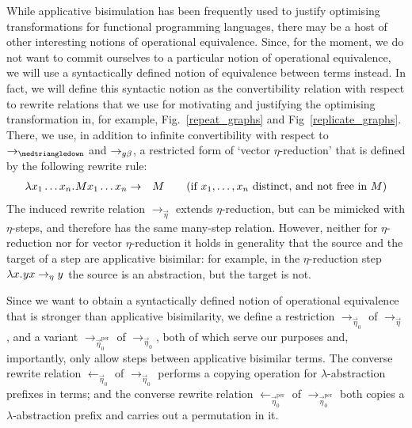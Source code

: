 \documentclass[submission,copyright,creativecommons]{eptcs}
\newcommand{\slabs}{{\lambda}}
\newcommand{\lbind}[1]{{\slabs{#1}}}
\newcommand{\labs}[2]{\lbind{#1}.\hspace*{0.5pt}{#2}}
\newcommand{\lapp}[2]{{#1}{#2}}
\newcommand{\avar}{x}
\newcommand{\bvar}{y}
\newcommand{\alter}{M}
\newcommand{\sred}{\rightarrow}
\newcommand{\red}{\mathrel{\sred}}
\newcommand{\indap}[2]{#1_{#2}}
\newcommand{\sredi}{\indap{\rightarrow}}
\newcommand{\sinvredi}{\indap{\leftarrow}}
\newcommand{\genbetaredsubscript}{g\hspace*{0pt}\beta}
\newcommand{\sgenbetared}{\sredi{\genbetaredsubscript}}
\newcommand{\setared}{\sredi{\eta}}
\newcommand{\etared}{\mathrel{\setared}}
\newcommand{\veceta}{\vec{\eta}}
\newcommand{\svecetared}{\sredi{\veceta}}
\newcommand{\vecetazero}{\vec{\eta}_0}
\newcommand{\svecetazerored}{\sredi{\vecetazero}}
\newcommand{\sinvvecetazerored}{\sinvredi{\vecetazero}}
\newcommand{\vecetazeroperm}{\vec{\eta}_{0}^{\text{per}}}
\newcommand{\svecetazeropermred}{\sredi{{\vecetazeroperm}}}
\newcommand{\sinvvecetazeropermred}{\sinvredi{\vecetazeroperm}}
\newcommand{\unfoldredsubscript}{\medtriangledown}
\newcommand{\sunfoldred}{\sredi{\unfoldredsubscript}}
\newcommand{\nbd}{\nobreakdash}
\newcommand{\nbde}{\nobreakdash-\hspace*{0pt}}
\renewcommand\;{\,}
\begin{document}
While applicative bisimulation has been frequently used to justify optimising transformations
for functional programming languages, there may be a host of other interesting notions of operational equivalence.
Since, for the moment, we do not want to commit ourselves to a particular notion of operational equivalence, 
we will use a syntactically defined notion of equivalence between terms instead.
In fact, we will define this  syntactic notion as the convertibility relation with respect to 
rewrite relations that we use for motivating and justifying the optimising transformation
in, for example, Fig.~\ref{repeat_graphs} and Fig~\ref{replicate_graphs}.  
There, we use, in addition to infinite convertibility with respect to $\sunfoldred$ and $\sgenbetared$,
a restricted form of `vector $\eta$\nbde{}reduction' that is defined by the following rewrite rule:
\begin{eqnarray*}
\labs{\avar_1\ldots\avar_n}{\lapp{\alter}{\avar_1\ldots\avar_n}}
      & \red &
  \alter
  \qquad\text{(if $\avar_1, \ldots, \avar_n$ distinct, and not free in $\alter$)}
\end{eqnarray*}
The induced rewrite relation $\svecetared$ extends $\eta$\nbde{}reduction, but can be mimicked with $\eta$\nbd-steps,
and therefore has the same many-step relation.
However, neither for $\eta$\nbde{}reduction nor for vector $\eta$\nbde{}reduction
it holds in generality that the source and the target of a step are applicative bisimilar:
for example, in the $\eta$\nbde{}reduction step $\labs{\avar}{\lapp{\bvar}{\avar}} \etared \bvar$
the source is an abstraction, but the target is not.

Since we want to obtain a syntactically defined notion of operational equivalence that is stronger than applicative bisimilarity,
we define a restriction $\svecetazerored$ of $\svecetared$, and a variant $\svecetazeropermred$ of $\svecetazerored$,
both of which serve our purposes and, importantly, only allow steps between applicative bisimilar terms.
The converse rewrite relation $\sinvvecetazerored$ of $\svecetazerored$ 
performs a copying operation for $\lambda$\nbde{}abstraction prefixes in terms;
and the converse rewrite relation $\sinvvecetazeropermred$ of $\svecetazeropermred$
both copies a $\lambda$\nbde{}abstraction prefix and carries out a permutation in it.
\end{document}
